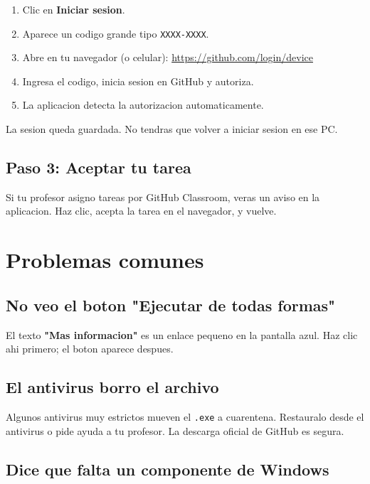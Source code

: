 \documentclass[11pt,a4paper,oneside]{report}
\begin{document}
\begin{enumerate}
  \item Clic en \textbf{Iniciar sesion}.
  \item Aparece un codigo grande tipo \texttt{XXXX-XXXX}.
  \item Abre en tu navegador (o celular): \url{https://github.com/login/device}
  \item Ingresa el codigo, inicia sesion en GitHub y autoriza.
  \item La aplicacion detecta la autorizacion automaticamente.
\end{enumerate}

\begin{notebox}
La sesion queda guardada. No tendras que volver a iniciar sesion en ese PC.
\end{notebox}

\section{Paso 3: Aceptar tu tarea}

Si tu profesor asigno tareas por GitHub Classroom, veras un aviso en la
aplicacion. Haz clic, acepta la tarea en el navegador, y vuelve.

\chapter{Problemas comunes}

\section{No veo el boton "Ejecutar de todas formas"}

El texto \textbf{"Mas informacion"} es un enlace pequeno en la pantalla azul.
Haz clic ahi primero; el boton aparece despues.

\section{El antivirus borro el archivo}

Algunos antivirus muy estrictos mueven el \texttt{.exe} a cuarentena.
Restauralo desde el antivirus o pide ayuda a tu profesor. La descarga oficial
de GitHub es segura.

\section{Dice que falta un componente de Windows}
\end{document}
